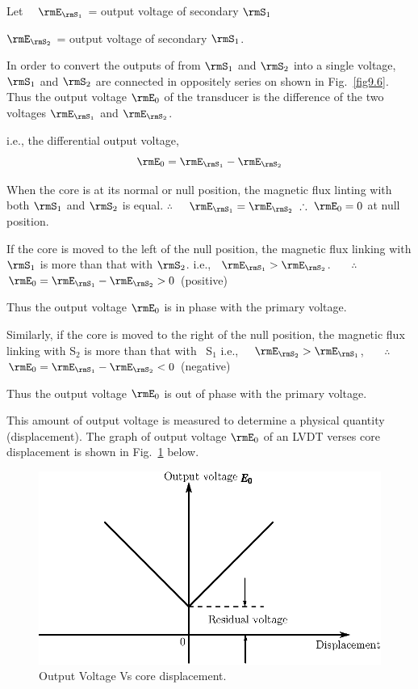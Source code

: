 Let~~ $\rmE_{\rmS_1}$ = output voltage of secondary $\rmS_1$

\smallskip
\qquad $\rmE_{\rmS_2}$ = output voltage of secondary $\rmS_1$.

\smallskip
In order to convert the outputs of from $\rmS_1$ and $\rmS_2$ into a single
voltage, $\rmS_1$ and $\rmS_2$ are connected in oppositely series on shown
in Fig.~\ref{fig9.6}. Thus the output voltage $\rmE_0$ of the transducer
is the difference of the two voltages $\rmE_{\rmS_1}$ and $\rmE_{\rmS_2}$.

\smallskip
i.e., the differential output voltage,
\begin{equation}
\rmE_0 = \rmE_{\rmS_1} - \rmE_{\rmS_2} \label{eq9.7}
\end{equation}

When the core is at its normal or null position, the magnetic flux
linting with both $\rmS_1$ and $\rmS_2$ is equal. $\therefore$~~
$\rmE_{\rmS_1} = \rmE_{\rmS_2}$ \quad $\therefore ~ \rmE_0 = 0$ at
null position.

\smallskip
If the core is moved to the left of the null position, the magnetic
flux linking with $\rmS_1$ is more than that with
$\rmS_2$. i.e., ~$\rmE_{\rmS_1} > \rmE_{\rmS_2}$.~ ~~$\therefore$~ $\rmE_0=
\rmE_{\rmS_1} - \rmE_{\rmS_2} > 0$ (positive) 

\smallskip
Thus the output voltage $\rmE_0$ is in phase with the primary voltage.

\smallskip
Similarly, if the core is moved to the right of the null position, the
magnetic flux linking with S$_2$ is more than that with ~S$_1$ i.e.,
~~$\rmE_{\rmS_2} > \rmE_{\rmS_1}$,~~ ~$\therefore$~ $\rmE_0 = \rmE_{\rmS_1} -
\rmE_{\rmS_2} < 0$ (negative) 

\smallskip
Thus the output voltage $\rmE_0$ is out of phase with the primary
voltage.

\smallskip
This amount of output voltage is measured to determine a physical
quantity (displacement). The graph of output voltage $\rmE_0$ of an
LVDT verses core displacement is shown in Fig.~\ref{fig9.8} below.
\begin{figure}[H]
\centering
\includegraphics{chap9/fig9.6.eps}
\caption{Output Voltage  Vs core displacement.}\label{fig9.8}
\end{figure}

